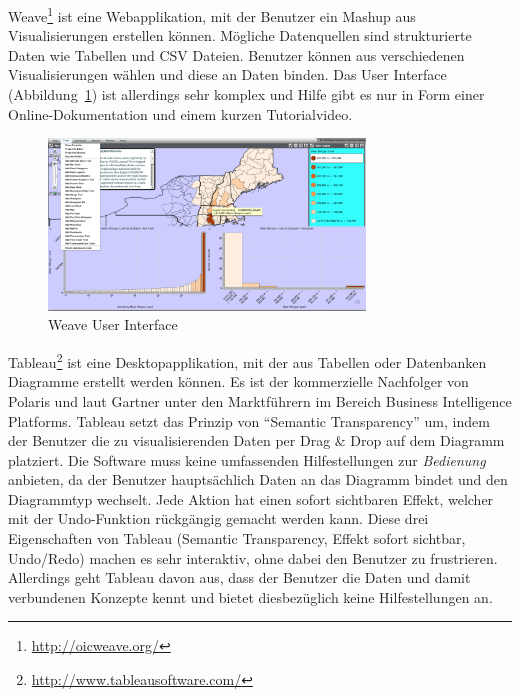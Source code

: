 \documentclass[
	headsepline,
	footsepline,
	fontsize=12pt,
	bibliography=totoc
]{scrbook}
\begin{document}
Weave\footnote{\url{http://oicweave.org/}} ist eine Webapplikation, mit der Benutzer ein Mashup aus Visualisierungen erstellen können. Mögliche Datenquellen sind strukturierte Daten wie Tabellen und CSV Dateien. Benutzer können aus verschiedenen Visualisierungen wählen und diese an Daten binden. Das User Interface (Abbildung~\ref{figure:weave}) ist allerdings sehr komplex und Hilfe gibt es nur in Form einer Online-Dokumentation und einem kurzen Tutorialvideo.

\begin{figure}[htbp]
   \centering
   \includegraphics[width=0.75\textwidth]{images/verwandte_arbeiten-weave.png}
   \caption{Weave User Interface}
   \label{figure:weave}
\end{figure}


Tableau\footnote{\url{http://www.tableausoftware.com/}} ist eine Desktopapplikation, mit der aus Tabellen oder Datenbanken Diagramme erstellt werden können. Es ist der kommerzielle Nachfolger von Polaris \cite{Stolte2000} und laut Gartner \cite{Gartner2013} unter den Marktführern im Bereich Business Intelligence Platforms. Tableau setzt das Prinzip von \enquote{Semantic Transparency} um, indem der Benutzer die zu visualisierenden Daten per Drag \& Drop auf dem Diagramm platziert. Die Software muss keine umfassenden Hilfestellungen zur \emph{Bedienung} anbieten, da der Benutzer hauptsächlich Daten an das Diagramm bindet und den Diagrammtyp wechselt. Jede Aktion hat einen sofort sichtbaren Effekt, welcher mit der Undo-Funktion rückgängig gemacht werden kann. Diese drei Eigenschaften von Tableau (Semantic Transparency, Effekt sofort sichtbar, Undo/Redo) machen es sehr interaktiv, ohne dabei den Benutzer zu frustrieren. Allerdings geht Tableau davon aus, dass der Benutzer die Daten und damit verbundenen Konzepte kennt und bietet diesbezüglich keine Hilfestellungen an.
\end{document}
